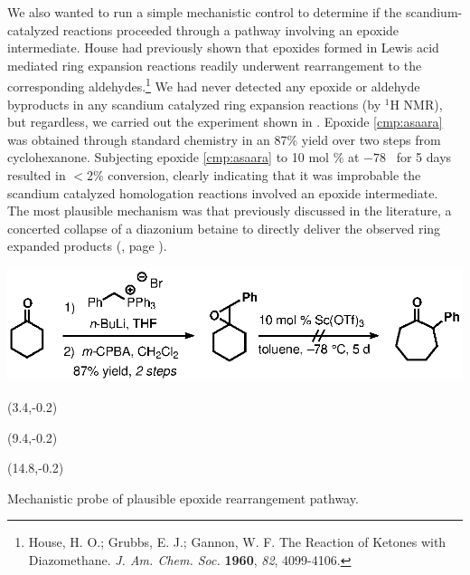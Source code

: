 We also wanted to run a simple mechanistic control to determine if the scandium-catalyzed reactions
proceeded through a pathway involving an epoxide intermediate. House had previously shown that
epoxides formed in Lewis acid mediated ring expansion reactions readily underwent rearrangement
to the corresponding aldehydes.\footnote{{\frenchspacing House, H. O.; Grubbs, E. J.; Gannon, W. F.
The Reaction of Ketones with Diazomethane. \textit{J. Am. Chem. Soc.} \textbf{1960}, \textit{82},
4099-4106.}} We had never detected any epoxide or aldehyde byproducts in any scandium catalyzed ring expansion reactions (by $^1$H NMR), but regardless, we carried out the experiment shown in . Epoxide \ref{cmp:asaara} was obtained
through standard chemistry in an 87\% yield over two steps from cyclohexanone. Subjecting
epoxide \ref{cmp:asaara} to 10 mol \%  at $-78$ \degc\  for 5 days resulted in $<$2\%
conversion, clearly indicating that it was improbable the scandium catalyzed homologation reactions
involved an epoxide intermediate. The most plausible mechanism was that
previously discussed in the literature, a concerted collapse of a diazonium
betaine to directly deliver the observed ring expanded products
(, page \pageref{sch:mechanism}).

 \begin{Scheme}[h]
  \centering
  \includegraphics[scale=0.8]{chp_asymmetric/images/epoxideexperiment}
  \begin{textblock}{1}(3.4,-0.2)  \end{textblock}
   \begin{textblock}{1}(9.4,-0.2)  \end{textblock}
   \begin{textblock}{1}(14.8,-0.2)  \end{textblock}
  \caption{Mechanistic probe of plausible epoxide rearrangement pathway.}
  \label{sch:asepoxideexperiment}
\end{Scheme}   

